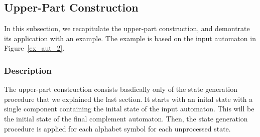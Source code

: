 



\subsection{Upper-Part Construction}
\label{3_upper_part}
In this subsection, we recapitulate the upper-part construction, and demontrate its application with an example. The example is based on the input automaton in Figure~\ref{ex_aut_2}.

\subsubsection{Description}
The upper-part construction consists basdically only of the state generation procedure that we explained the last section. It starts with an inital state with a single component containing the inital state of the input automaton. This will be the initial state of the final complement automaton. Then, the state generation procedure is applied for each alphabet symbol for each unprocessed state.

